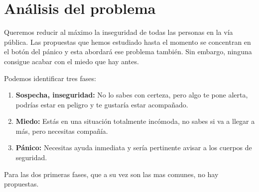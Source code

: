 \chapter{Análisis del problema}
 
Queremos reducir al máximo la inseguridad de todas las personas en la vía pública.
Las propuestas que hemos estudiado hasta el momento se concentran en el botón del pánico y esta abordará ese problema también.
Sin embargo, ninguna consigue acabar con el miedo que hay antes.

Podemos identificar tres fases:
\begin{enumerate}
  \item \textbf{Sospecha, inseguridad:} No lo sabes con certeza, pero algo te pone alerta, podrías estar en peligro y te gustaría estar acompañado.
  \item \textbf{Miedo:} Estás en una situación totalmente incómoda, no sabes si va a llegar a más, pero necesitas compañía.
  \item \textbf{Pánico:} Necesitas ayuda inmediata y sería pertinente avisar a los cuerpos de seguridad.
\end{enumerate}

Para las dos primeras fases, que a su vez son las mas comunes, no hay propuestas.